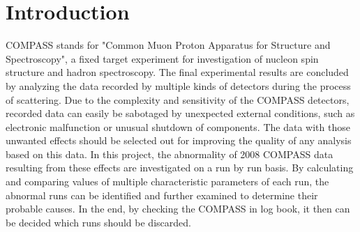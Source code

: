 \section{Introduction}
COMPASS stands for "Common Muon Proton Apparatus for Structure and Spectroscopy", a fixed target experiment for investigation of nucleon spin structure and hadron spectroscopy. The final experimental results are concluded by analyzing the data recorded by multiple kinds of detectors during the process of scattering. Due to the complexity and sensitivity of the COMPASS detectors, recorded data can easily be sabotaged by unexpected external conditions, such as electronic malfunction or unusual shutdown of components. The data with those unwanted effects should be selected out for improving the quality of any analysis based on this data. In this project, the abnormality of 2008 COMPASS data resulting from these effects are investigated on a run by run basis. By calculating and comparing values of multiple characteristic parameters of each run, the abnormal runs can be identified and further examined to determine their probable causes. In the end, by checking the COMPASS in log book, it then can be decided which runs should be discarded.